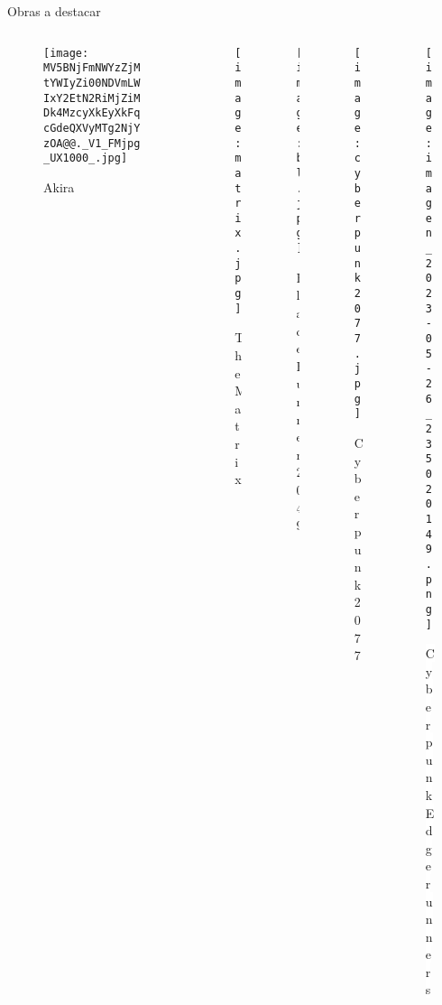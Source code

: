 \documentclass[aspectratio = 1609]{beamer}
\begin{document}
\begin{frame}{Obras a destacar}

\begin{columns}
    \begin{column}{.2\textwidth}
    \begin{figure}
    \texttt{[image: MV5BNjFmNWYzZjMtYWIyZi00NDVmLWIxY2EtN2RiMjZiMDk4MzcyXkEyXkFqcGdeQXVyMTg2NjYzOA@@.\_V1\_FMjpg\_UX1000\_.jpg]}
    \caption{Akira}
    \end{figure}
    \end{column}
    \begin{column}{.2\textwidth}
    \begin{figure}
    \texttt{[image: matrix.jpg]}
    \caption{The Matrix}
    \end{figure}
    \end{column}
    \begin{column}{.2\textwidth}
    \begin{figure}
    \texttt{[image: bl.jpg]}
    \caption{Blade Runner 2049}
    \end{figure}    
    \end{column}
    \begin{column}{.2\textwidth}
    \begin{figure}
    \texttt{[image: cyberpunk2077.jpg]}
    \caption{Cyberpunk 2077}
    \end{figure}
    \end{column}
    \begin{column}{.2\textwidth}
    \begin{figure}
    \texttt{[image: imagen\_2023-05-26\_235020149.png]}
    \caption{\centering\colorbox{white}{\scriptsize Cyberpunk Edgerunners}}
    \end{figure}
    \end{column}
\end{columns}
\end{frame}
\end{document}
